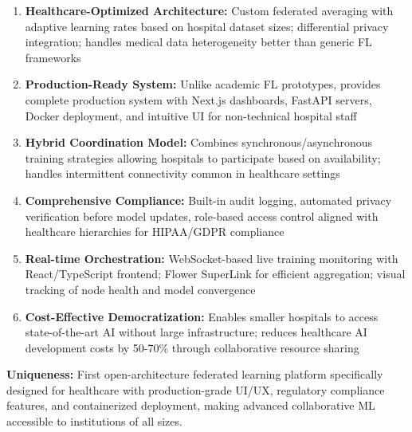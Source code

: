 \begin{enumerate}[noitemsep]
    \item \textbf{Healthcare-Optimized Architecture:} Custom federated averaging with adaptive learning rates based on hospital dataset sizes; differential privacy integration; handles medical data heterogeneity better than generic FL frameworks
    
    \item \textbf{Production-Ready System:} Unlike academic FL prototypes, provides complete production system with Next.js dashboards, FastAPI servers, Docker deployment, and intuitive UI for non-technical hospital staff
    
    \item \textbf{Hybrid Coordination Model:} Combines synchronous/asynchronous training strategies allowing hospitals to participate based on availability; handles intermittent connectivity common in healthcare settings
    
    \item \textbf{Comprehensive Compliance:} Built-in audit logging, automated privacy verification before model updates, role-based access control aligned with healthcare hierarchies for HIPAA/GDPR compliance
    
    \item \textbf{Real-time Orchestration:} WebSocket-based live training monitoring with React/TypeScript frontend; Flower SuperLink for efficient aggregation; visual tracking of node health and model convergence
    
    \item \textbf{Cost-Effective Democratization:} Enables smaller hospitals to access state-of-the-art AI without large infrastructure; reduces healthcare AI development costs by 50-70\% through collaborative resource sharing
\end{enumerate}

\textbf{Uniqueness:} First open-architecture federated learning platform specifically designed for healthcare with production-grade UI/UX, regulatory compliance features, and containerized deployment, making advanced collaborative ML accessible to institutions of all sizes.
